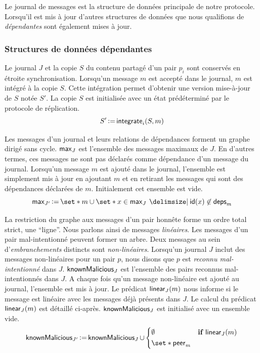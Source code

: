Le journal de messages est la structure de données principale de notre protocole.
Lorsqu'il est mis à jour d'autres structures de données que nous qualifions de \emph{dépendantes} sont également mises à jour.

\subsubsection{Structures de données dépendantes}

Le journal $J$ et la copie $S$ du contenu partagé d'un pair $p_i$ sont conservés en étroite synchronisation.
Lorsqu'un message $m$ est accepté dans le journal, $m$ est intégré à la copie $S$.
Cette intégration permet d'obtenir une version mise-à-jour de $S$ notée $S'$.
La copie $S$ est initialisée avec un état prédéterminé par le protocole de réplication.
%
\begin{equation*}
    S' \operatorname{\vcentcolon=} \operatorname{\mathsf{integrate}}_i(S, m)
\end{equation*}

Les messages d'un journal et leurs relations de dépendances forment un graphe dirigé sans cycle.
$\operatorname{\mathsf{max}}_J$ est l'ensemble des messages maximaux de $J$.
En d'autres termes, ces messages ne sont pas déclarés comme dépendance d'un message du journal.
Lorsqu'un message $m$ est ajouté dans le journal, l'ensemble est simplement mis à jour en ajoutant $m$ et en retirant les messages qui sont des dépendances déclarées de $m$.
Initialement cet ensemble est vide.
%
\begin{equation*}
    \trm{max}_{J'} \assign \set*{m} \cup \set*{x \in \trm{max}_J \given \trm{id}(x) \not\in \trm{deps}_m}
\end{equation*}

La restriction du graphe aux messages d'un pair honnête forme un ordre total strict, une \enquote{ligne}.
Nous parlons ainsi de messages \emph{linéaires}.
Les messages d'un pair mal-intentionné peuvent former un arbre.
Deux messages au sein d'\emph{embranchements} distincts sont \emph{non-linéaires}.
Lorsqu'un journal $J$ inclut des messages non-linéaires pour un pair $p$, nous disons que $p$ est \emph{reconnu mal-intentionné} dans $J$.
$\operatorname{\mathsf{knownMalicious}}_J$ est l'ensemble des pairs reconnus mal-intentionnés dans $J$.
A chaque fois qu'un message non-linéaire est ajouté au journal, l'ensemble est mis à jour.
Le prédicat $\operatorname{\mathsf{linear}}_J(m)$ nous informe si le message est linéaire avec les messages déjà présents dans $J$.
Le calcul du prédicat $\operatorname{\mathsf{linear}}_J(m)$ est détaillé ci-après.
$\operatorname{\mathsf{knownMalicious}}_J$ est initialisé avec un ensemble vide.
%
\begin{equation*}
    \trm{knownMalicious}_{J'} \assign \trm{knownMalicious}_J \cup \begin{dcases}
        \emptyset & \when \trm{linear}_J(m)\\
        \set*{\trm{peer}_m} &
    \end{dcases}
\end{equation*}

